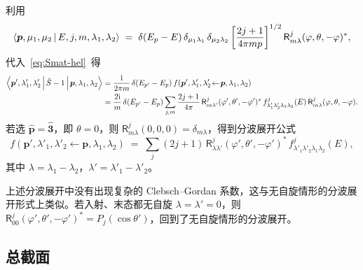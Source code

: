 利用
\begin{equation}
  \left\langle \bm p,\mu_1,\mu_2 \,\middle|\, E,j,m,\lambda_1,\lambda_2 \right\rangle
  \;=\; \delta(E_p - E)\,\delta_{\mu_1\lambda_1}\,\delta_{\mu_2\lambda_2}\left[\frac{2j+1}{4\pi mp}\right]^{1/2} \mathsf{R}^{j}_{m\lambda}(\varphi,\theta,-\varphi)^*,
  \label{eq:pmu-Ejm}
\end{equation}
代入~\eqref{eq:Smat-hel}~得
\begin{align}
  \left\langle \bm p',\lambda'_1,\lambda'_2 \,\middle|\, \hat{S}-1 \,\middle|\, \bm p,\lambda_1,\lambda_2 \right\rangle
  &= \frac{\mathrm{i}}{2\pi m}\,\delta(E_{p'}-E_p)\,f(\bm p',\lambda'_1,\lambda'_2 \!\leftarrow\! \bm p,\lambda_1,\lambda_2) \notag\\
  &= \frac{2\mathrm{i}}{m}\,\delta(E_{p'}-E_p)\sum_{j,m}\frac{2j+1}{4\pi}\,\mathsf{R}^{j}_{m\lambda'}(\varphi',\theta',-\varphi')^*\,
     f^{j}_{\lambda'_1\lambda'_2\lambda_1\lambda_2}(E)\,
     \mathsf{R}^{j}_{m\lambda}(\varphi,\theta,-\varphi).
  \label{eq:Sm1-pw}
\end{align}
若选 $\hat{\bm p}=\hat{\bm 3}$，即 $\theta=0$，则 $\mathsf{R}^{j}_{m\lambda}(0,0,0)=\delta_{m\lambda}$，得到分波展开公式
\begin{equation}
\boxed{\;
  f(\bm p',\lambda'_1,\lambda'_2 \leftarrow \bm p,\lambda_1,\lambda_2)
  \;=\; \sum_j (2j+1)\,\mathsf{R}^{j}_{\lambda\lambda'}(\varphi',\theta',-\varphi')^*\,
        f^{j}_{\lambda'_1\lambda'_2\lambda_1\lambda_2}(E),
  \;}
  \label{eq:pw-helicity}
\end{equation}
其中 $\lambda=\lambda_1-\lambda_2$，$\lambda'=\lambda'_1-\lambda'_2$。

\begin{remark}
上述分波展开中没有出现复杂的 Clebsch–Gordan 系数，这与无自旋情形的分波展开形式上类似。若入射、末态都无自旋 $\lambda=\lambda'=0$，则 $\mathsf{R}^{j}_{00}(\varphi',\theta',-\varphi')^*=P_j(\cos\theta')$，回到了无自旋情形的分波展开。
\end{remark}

\subsection{总截面}

